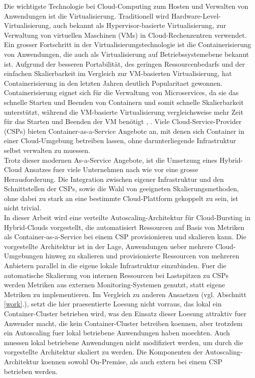 \documentclass[runningheads]{llncs}
\begin{document}
Die wichtigste Technologie bei Cloud-Computing zum Hosten und Verwalten von Anwendungen ist die Virtualisierung. Traditionell wird Hardware-Level-Virtualisierung, auch bekannt als Hypervisor-basierte Virtualisierung, zur Verwaltung von virtuellen Maschinen (VMs) in Cloud-Rechenzentren verwendet. Ein grosser Fortschritt in der Virtualisierungstechnologie ist die Containerisierung von Anwendungen, die auch als Virtualisierung auf Betriebssystemebene bekannt ist. Aufgrund der besseren Portabilität, des geringen Ressourcenbedarfs und der einfachen Skalierbarkeit im Vergleich zur VM-basierten Virtualisierung, hat Containerisierung in den letzten Jahren deutlich Popularitaet gewonnen. Containerisierung eignet sich für die Verwaltung von Microservices, da sie das schnelle Starten und Beenden von Containern und somit schnelle Skalierbarkeit unterstützt, während die VM-basierte Virtualisierung vergleichsweise mehr Zeit für das Starten und Beenden der VM benötigt \cite{al-dhuraibi_elasticity_2018}, \cite{abdullah_containers_2019}. Viele Cloud-Service-Provider (CSPs) bieten Container-as-a-Service Angebote an, mit denen sich Container in einer Cloud-Umgebung betreiben lassen, ohne darunterliegende Infrastruktur selbst verwalten zu muessen. \\

Trotz dieser modernen As-a-Service Angebote, ist die Umsetzung eines Hybrid-Cloud Ansatzes fuer viele Unternehmen nach wie vor eine grosse Herausforderung. Die Integration zwischen eigener Infrastruktur und den Schnittstellen der CSPs, sowie die Wahl von geeigneten Skalierungsmethoden, ohne dabei zu stark an eine bestimmte Cloud-Plattform gekoppelt zu sein, ist nicht trivial.  \\

In dieser Arbeit wird eine verteilte Autoscaling-Architektur für Cloud-Bursting in Hybrid-Clouds vorgestellt, die automatisiert Ressourcen auf Basis von Metriken als Container-as-a-Service bei einem CSP provisionieren und skalieren kann. Die vorgestellte Architektur ist in der Lage, Anwendungen ueber mehrere Cloud-Umgebungen hinweg zu skalieren und provisionierte Ressourcen von mehreren Anbietern parallel in die eigene lokale Infrastruktur einzubinden. Fuer die automatische Skalierung von internen Ressourcen bei Lastspitzen zu CSPs werden Metriken aus externen Monitoring-Systemen genutzt, statt eigene Metriken zu implementieren. Im Vergleich zu anderen Ansaetzen (vgl. Abschnitt \ref{work}.), setzt die hier praesentierte Loesung nicht vorraus, das lokal ein Container-Cluster betrieben wird, was den Einsatz dieser Loesung attraktiv fuer Anwender macht, die kein Container-Cluster betreiben koennen, aber trotzdem ein Autoscaling fuer lokal betriebene Anwendungen haben moechten. Auch muessen lokal betriebene Anwendungen nicht modifiziert werden, um durch die vorgestellte Architektur skaliert zu werden. Die Komponenten der Autoscaling-Architektur koennen sowohl On-Premise, als auch extern bei einem CSP betrieben werden.
\end{document}
